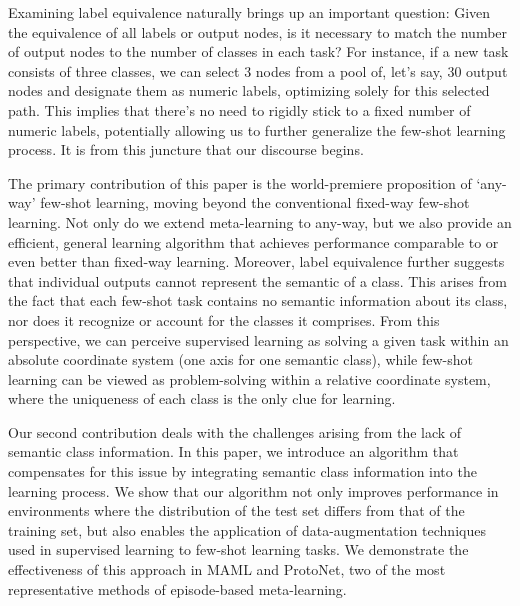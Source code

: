 \documentclass[letterpaper]{article} %
\newcommand{\nj}[1]{\textcolor{black}{#1}}
\newcommand{\jh}[1]{\textcolor{black}{#1}}
\begin{document}
Examining label equivalence naturally brings up an important question: Given the equivalence of all labels or output nodes,
is it necessary 
to match the number of output nodes to the number of classes in each task? For instance, if a new task consists of three classes, we can select 3 nodes from a pool of, let's say,  
30 output nodes and designate them as numeric labels, optimizing solely for this selected path. This implies that there's no need to rigidly stick to a fixed number of numeric labels, potentially allowing us to further generalize the few-shot learning process. It is from this juncture that our discourse begins.

The primary contribution of this paper is the world-premiere proposition of 
`any-way' few-shot learning, moving beyond the conventional fixed-way few-shot learning. Not only do we extend meta-learning to any-way, but we also provide an efficient, general learning algorithm that achieves performance comparable to or even better %
than fixed-way learning. Moreover, label equivalence further suggests that individual outputs cannot represent the semantic of a class. This arises from the fact that each few-shot task %
contains no semantic information about its class, nor does it recognize or account for the classes it comprises. From this perspective, we can perceive supervised learning as solving a given task within an absolute coordinate system (one axis for one semantic class), while few-shot learning can be viewed as problem-solving within a relative coordinate system, where the uniqueness of each class is the only clue for learning. %

Our second contribution deals with the challenges arising from the lack of semantic class information. In this paper, we introduce an algorithm that compensates for this issue by integrating semantic class information into the learning process. We show that our algorithm not only improves performance in environments where the distribution of the test set differs from that of the training set, but also enables the application of data-augmentation techniques used in supervised learning to few-shot learning tasks. We demonstrate the effectiveness of this approach in MAML and ProtoNet, two of the most representative methods of episode-based meta-learning.
\end{document}
